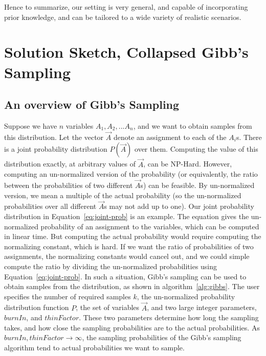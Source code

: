 \documentclass{sig-alternate}
\newcounter{prob}
\begin{document}
Hence to summarize, our setting is very general, and capable of incorporating prior knowledge, and can be tailored to a wide variety of realistic scenarios. 

\section{Solution Sketch, Collapsed Gibb's Sampling}

\subsection{An overview of Gibb's Sampling}
Suppose we have $n$ variables $A_1, A_2, ... A_n$, and we want to obtain samples from this distribution. Let the vector $\overrightarrow{A}$ denote an assignment to each of the $A_i$s. There is a joint probability distribution $P(\overrightarrow{A})$ over them. Computing the value of this distribution exactly, at arbitrary values of $\overrightarrow{A}$, can be NP-Hard. However, computing an un-normalized version of the probability (or equivalently, the ratio between the probabilities of two different $\overrightarrow{A}$s) can be feasible. By un-normalized version, we mean a multiple of the actual probability (so the un-normalized probabilities over all different $\overrightarrow{A}$s may not add up to one). Our joint probability distribution in Equation~\ref{eq:joint-prob} is an example. The equation gives the un-normalized probability of an assignment to the variables, which can be computed in linear time. But computing the actual probability would require computing the normalizing constant, which is hard. If we want the ratio of probabilities of two assignments, the normalizing constants would cancel out, and we could simple compute the ratio by dividing the un-normalized probabilities using Equation~\ref{eq:joint-prob}. In such a situation, Gibb's sampling can be used to obtain samples from the distribution, as shown in algorithm~\ref{alg:gibbs}. The user specifies the number of required samples $k$, the un-normalized probability distribution function $P$, the set of variables $\overrightarrow{A}$, and two large integer parameters, $burnIn$, and $thinFactor$. These two parameters determine how long the sampling takes, and how close the sampling probabilities are to the actual probabilities. As $burnIn, thinFactor \rightarrow \infty$, the sampling probabilities of the Gibb's sampling algorithm tend to actual probabilities we want to sample.
\end{document}
